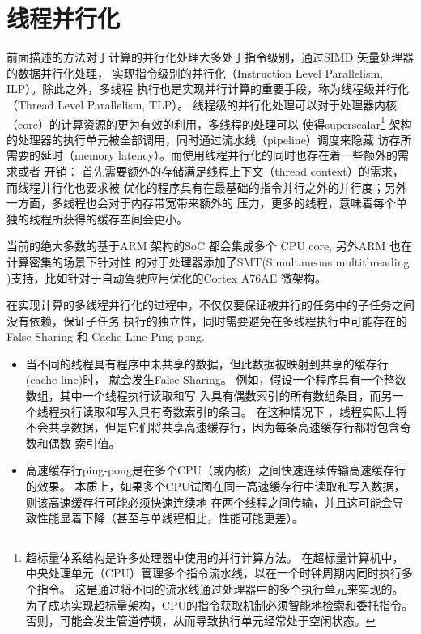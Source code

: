 
\section{线程并行化}
前面描述的方法对于计算的并行化处理大多处于指令级别，通过SIMD 矢量处理器的数据并行化处理，
实现指令级别的并行化（Instruction Level Parallelism, ILP）。除此之外，多线程
执行也是实现并行计算的重要手段，称为线程级并行化（Thread Level Parallelism, TLP）。
线程级的并行化处理可以对于处理器内核（core）的计算资源的更为有效的利用，多线程的处理可以
使得superscalar\footnote{超标量体系结构是许多处理器中使用的并行计算方法。 在超标量计算机中，中央处理单元（CPU）管理多个指令流水线，以在一个时钟周期内同时执行多个指令。 这是通过将不同的流水线通过处理器中的多个执行单元来实现的。 为了成功实现超标量架构，CPU的指令获取机制必须智能地检索和委托指令。 否则，可能会发生管道停顿，从而导致执行单元经常处于空闲状态。
} 架构的处理器的执行单元被全部调用，同时通过流水线（pipeline）调度来隐藏
访存所需要的延时（memory latency）。而使用线程并行化的同时也存在着一些额外的需求或者
开销： 首先需要额外的存储满足线程上下文（thread context）的需求，而线程并行化也要求被
优化的程序具有在最基础的指令并行之外的并行度；另外一方面，多线程也会对于内存带宽带来额外的
压力，更多的线程，意味着每个单独的线程所获得的缓存空间会更小。

当前的绝大多数的基于ARM 架构的SoC 都会集成多个 CPU core, 另外ARM 也在计算密集的场景下针对性
的对于处理器添加了SMT(Simultaneous multithreading )支持，比如针对于自动驾驶应用优化的Cortex 
A76AE 微架构。

在实现计算的多线程并行化的过程中，不仅仅要保证被并行的任务中的子任务之间没有依赖，保证子任务
执行的独立性，同时需要避免在多线程执行中可能存在的 False Sharing 和 Cache Line Ping-pong.

\begin{itemize}
  \item 当不同的线程具有程序中未共享的数据，但此数据被映射到共享的缓存行(cache line)时，
  就会发生False Sharing。 例如，假设一个程序具有一个整数数组，其中一个线程执行读取和写
  入具有偶数索引的所有数组条目，而另一个线程执行读取和写入具有奇数索引的条目。 在这种情况下
  ，线程实际上将不会共享数据，但是它们将共享高速缓存行，因为每条高速缓存行都将包含奇数和偶数
  索引值。
  \item 高速缓存行ping-pong是在多个CPU（或内核）之间快速连续传输高速缓存行的效果。
  本质上，如果多个CPU试图在同一高速缓存行中读取和写入数据，则该高速缓存行可能必须快速连续地
  在两个线程之间传输，并且这可能会导致性能显着下降（甚至与单线程相比，性能可能更差）。
\end{itemize}

